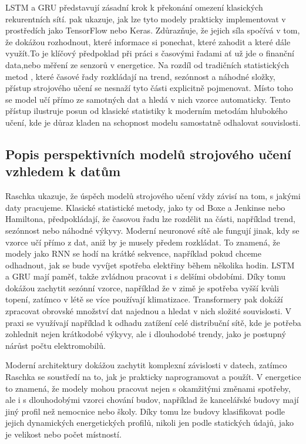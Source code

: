  LSTM a GRU představují zásadní krok k překonání omezení klasických rekurentních 
sítí. \cite{Raschka2019} pak ukazuje, jak lze tyto modely prakticky implementovat v prostředích jako TensorFlow nebo Keras. Zdůrazňuje, že jejich síla spočívá v tom, že dokážou rozhodnout, které informace si ponechat, které 
zahodit a které dále využít.To je klíčový předpoklad při práci s časovými řadami  ať už jde o finanční data,nebo měření ze senzorů v energetice.
Na rozdíl od tradičních statistických metod \cite{BoxJenkins1976, Hamilton1994}, které časové řady rozkládají na trend, sezónnost a náhodné složky, přístup strojového učení se nesnaží tyto části explicitně pojmenovat. Místo toho se model učí přímo ze samotných dat a hledá v nich vzorce automaticky. 
Tento přístup ilustruje posun od klasické statistiky k moderním metodám hlubokého učení, kde je důraz kladen na schopnost modelu samostatně odhalovat souvislosti.
\subsection{Popis perspektivních modelů strojového učení vzhledem k datům}
Raschka \cite{Raschka2019} ukazuje, že úspěch modelů strojového učení vždy závisí na tom, s jakými daty pracujeme. 
Klasické statistické metody, jako ty od Boxe a Jenkinse nebo Hamiltona, předpokládají, že časovou řadu lze rozdělit na části, například trend, sezónnost nebo náhodné výkyvy. Moderní neuronové sítě ale fungují jinak, kdy se 
vzorce učí přímo z dat, aniž by je musely předem rozkládat. To znamená, že modely jako RNN se hodí na krátké sekvence, například pokud chceme odhadnout, jak se bude vyvíjet spotřeba elektřiny během několika hodin. 
LSTM a GRU mají paměť, takže zvládnou pracovat i s delšími obdobími. Díky tomu dokážou zachytit sezónní vzorce, například že v zimě je spotřeba vyšší kvůli topení, zatímco v létě se více používají klimatizace. Transformery pak 
dokáží zpracovat obrovské množství dat najednou a hledat v nich složité souvislosti. V praxi se využívají například k odhadu zatížení celé distribuční sítě, kde je potřeba zohlednit nejen krátkodobé výkyvy, ale i dlouhodobé trendy, jako je postupný nárůst počtu elektromobilů.

Moderní architektury dokážou zachytit komplexní závislosti v datech, zatímco Raschka \cite{Raschka2019} se soustředí na to, jak je prakticky naprogramovat a použít. V energetice to znamená, 
že modely mohou pracovat nejen s okamžitými změnami spotřeby, ale i s dlouhodobými vzorci chování budov, například že kancelářské budovy mají jiný profil než nemocnice nebo školy. Díky tomu lze budovy klasifikovat podle jejich 
dynamických energetických profilů, nikoli jen podle statických údajů, jako je velikost nebo počet místností.
